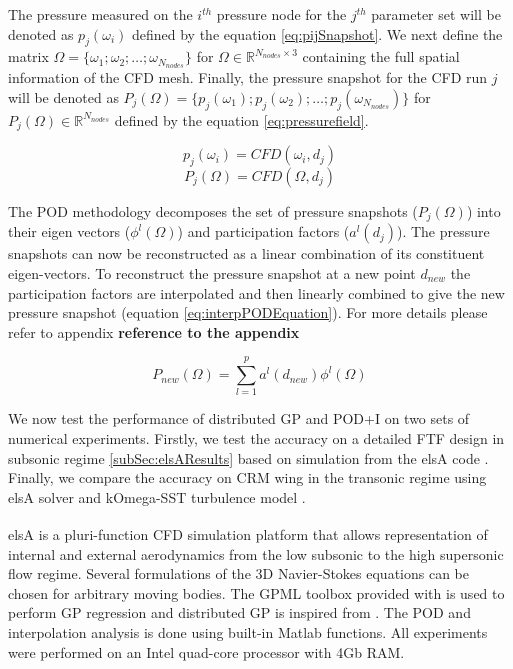 The pressure measured on the \(i^{th}\) pressure node for the \(j^{th}\) parameter set will be denoted as \(p_{j}(\omega_{i})\) defined by the equation \ref{eq:pijSnapshot}. We next define the matrix \(\Omega = \{\omega_{1}; \omega_{2}; \ldots ; \omega_{N_{nodes}}\}\) for \(\Omega \in \mathbb{R}^{N_{nodes} \times 3}\) containing the full spatial information of the CFD mesh. Finally, the pressure snapshot for the CFD run \(j\) will be denoted as \(P_{j}(\Omega) = \{p_{j}(\omega_{1}); p_{j}(\omega_{2}); \ldots ; p_{j}(\omega_{N_{nodes}})\}\) for \(P_{j}(\Omega) \in \mathbb{R}^{N_{nodes}}\) defined by the equation \ref{eq:pressurefield}.

\begin{equation} \label{eq:pijSnapshot}
p_{j}(\omega_{i}) = CFD(\omega_{i}, d_{j})
\end{equation} 
\begin{equation}\label{eq:pressurefield}
P_{j}(\Omega) = CFD(\Omega, d_{j})
\end{equation} 

The POD methodology decomposes the set of pressure snapshots ($P_{j}(\Omega)$) into their eigen vectors ($\phi^{l}(\Omega)$) and participation factors ($a^{l}(d_{j})$). The pressure snapshots can now be reconstructed as a linear combination of its constituent eigen-vectors. To reconstruct the pressure snapshot at a new point $d_{new}$ the participation factors are interpolated and then linearly combined to give the new pressure snapshot (equation \ref{eq:interpPODEquation}). For more details please refer to appendix \textbf{reference to the appendix}

\begin{equation}\label{eq:interpPODEquation}
P_{new}(\Omega) = \sum_{l=1}^{p}a^{l}(d_{new}) \phi^{l}(\Omega)
\end{equation}

We now test the performance of distributed GP and POD+I on two sets of numerical experiments. Firstly, we test the accuracy on a detailed FTF design \cite{Bosco2016} in subsonic regime \ref{subSec:elsAResults} based on simulation from the elsA code \cite{cambier2008status}. Finally, we compare the accuracy on CRM wing in the transonic regime using elsA solver and kOmega-SST turbulence model \cite{vassberg2014summary}. 

elsA\textsuperscript{\textregistered} \cite{cambier2008status} is a pluri-function CFD simulation platform that allows representation of internal and external aerodynamics from the low subsonic to the high supersonic flow regime. Several formulations of the 3D Navier-Stokes equations can be chosen for arbitrary moving bodies. The GPML toolbox provided with \cite{rasmussen2006gaussian} is used to perform GP regression and distributed GP is inspired from \cite{deisenroth2015distributed}. The POD and interpolation analysis is done using built-in Matlab functions\cite{mathworks2005matlab}. All experiments were performed on an Intel quad-core processor with 4Gb RAM.

